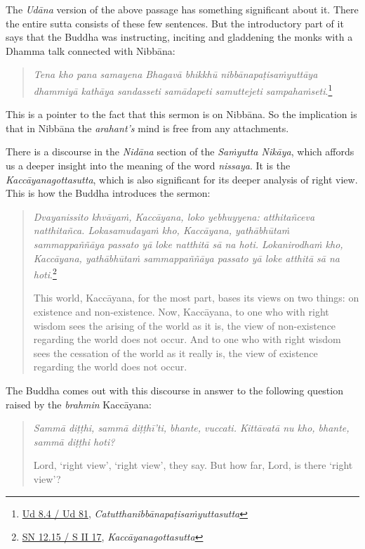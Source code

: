 The \emph{Udāna} version of the above passage has something significant about it. There the entire sutta consists of these few sentences. But the introductory part of it says that the Buddha was instructing, inciting and gladdening the monks with a Dhamma talk connected with Nibbāna:

\begin{quote}
\emph{Tena kho pana samayena Bhagavā bhikkhū nibbānapaṭisaṁyuttāya dhammiyā kathāya sandasseti samādapeti samuttejeti sampahaṁseti}.\footnote{\href{https://suttacentral.net/ud8.4/pli/ms}{Ud 8.4 / Ud 81}, \emph{Catutthanibbānapaṭisaṁyuttasutta}}
\end{quote}

This is a pointer to the fact that this sermon is on Nibbāna. So the implication is that in Nibbāna the \emph{arahant's} mind is free from any attachments.

There is a discourse in the \emph{Nidāna} section of the \emph{Saṁyutta Nikāya}, which affords us a deeper insight into the meaning of the word \emph{nissaya}. It is the \emph{Kaccāyanagottasutta}, which is also significant for its deeper analysis of right view. This is how the Buddha introduces the sermon:

\begin{quote}
\emph{Dvayanissito khvāyaṁ, Kaccāyana, loko yebhuyyena: atthitañceva natthitañca. Lokasamudayaṁ kho, Kaccāyana, yathābhūtaṁ sammappaññāya passato yā loke natthitā sā na hoti. Lokanirodhaṁ kho, Kaccāyana, yathābhūtaṁ sammappaññāya passato yā loke atthitā sā na hoti}.\footnote{\href{https://suttacentral.net/sn12.15/pli/ms}{SN 12.15 / S II 17}, \emph{Kaccāyanagottasutta}}

This world, Kaccāyana, for the most part, bases its views on two things: on existence and non-existence. Now, Kaccāyana, to one who with right wisdom sees the arising of the world as it is, the view of non-existence regarding the world does not occur. And to one who with right wisdom sees the cessation of the world as it really is, the view of existence regarding the world does not occur.
\end{quote}

The Buddha comes out with this discourse in answer to the following question raised by the \emph{brahmin} Kaccāyana:

\begin{quote}
\emph{Sammā diṭṭhi, sammā diṭṭhī'ti, bhante, vuccati. Kittāvatā nu kho, bhante, sammā diṭṭhi hoti?}

Lord, `right view', `right view', they say. But how far, Lord, is there `right view'?
\end{quote}

